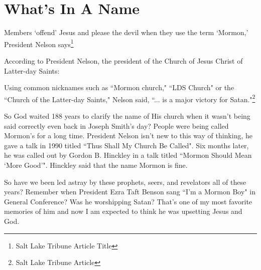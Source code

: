\chapter{What's In A Name}

\begin{displayquote}
Members `offend' Jesus and please the devil when they use the term `Mormon,' 
President Nelson says\footnote{Salt Lake Tribune Article Title}
\end{displayquote}

According to President Nelson, the president of the Church of Jesus Christ of
Latter-day Saints:

\begin{displayquote}
Using common nicknames such as ``Mormon church," ``LDS Church" or the 
``Church of the Latter-day Saints," Nelson said, ``... is a major victory for
Satan."\footnote{Salt Lake Tribune Article}
\end{displayquote}

So God waited 188 years to clarify the name of His church when it wasn't being said
correctly even back in Joseph Smith's day? People were being called Mormon's for a
long time. President Nelson isn't new to this way of thinking, he gave a talk in 1990
titled ``Thus Shall My Church Be Called". Six months later, he was called out by
Gordon B. Hinckley in a talk titled ``Mormon Should Mean `More Good'". Hinckley said
that the name Mormon is fine.

So have we been led astray by these prophets, seers, and revelators all of these
years? Remember when President Ezra Taft Benson sang ``I'm a Mormon Boy" in General
Conference? Was he worshipping Satan? That's one of my most favorite memories of him
and now I am expected to think he was upsetting Jesus and God.